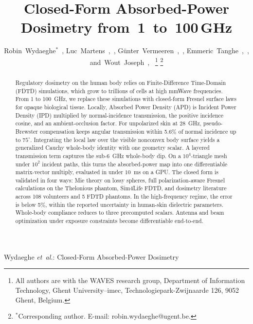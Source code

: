 \documentclass[journal,twocolumn,10pt]{IEEEtran}
\theoremstyle{plain}
\begin{document}
\title{Closed-Form Absorbed-Power Dosimetry from~1~to~100\,GHz}

\author{Robin~Wydaeghe$^{*}$~,
  Luc~Martens~,~,
  G\"unter~Vermeeren~,~,
  Emmeric~Tanghe~,~,
  and~Wout~Joseph~,~%
  \thanks{All authors are with the WAVES research group, Department of
  Information Technology, Ghent University--imec, Technologiepark-Zwijnaarde
  126, 9052 Ghent, Belgium.}%
  \thanks{$^{*}$Corresponding author. E-mail: robin.wydaeghe@ugent.be.}}

%
{Wydaeghe \MakeLowercase{\textit{et~al.}}: Closed-Form
Absorbed-Power Dosimetry}

\maketitle

\begin{abstract}
Regulatory dosimetry on the human body relies on Finite-Difference
Time-Domain (FDTD) simulations, which grow to trillions of cells at
high mmWave frequencies. From 1 to 100~GHz, we replace these
simulations with closed-form Fresnel surface laws for opaque
biological tissue. Locally, Absorbed Power Density (APD) is Incident
Power Density (IPD) multiplied by normal-incidence transmission, the positive
incidence cosine, and an ambient-occlusion factor. For
unpolarized skin at 28~GHz, pseudo-Brewster compensation keeps
angular transmission within 5.6\% of normal incidence up to
$75^\circ$. Integrating the local law over the visible nonconvex body
surface yields a generalized Cauchy whole-body identity with one
geometry scalar. A layered transmission term captures the sub-6~GHz
whole-body dip. On a $10^4$-triangle mesh under $10^2$ incident
paths, this turns the absorbed-power map into one differentiable
matrix-vector multiply, evaluated in under $10$~ms on a GPU. The
closed form is validated in four ways: Mie theory on lossy spheres,
full polarization-aware Fresnel calculations on the Thelonious
phantom, Sim4Life FDTD, and dosimetry literature across 108
volunteers and 5 FDTD phantoms. In the high-frequency regime, the
error is below 5\%, within the reported uncertainty in human-skin
dielectric parameters. Whole-body compliance reduces to three
precomputed scalars. Antenna and beam optimization under exposure
constraints become differentiable end-to-end.
\end{abstract}
\end{document}
